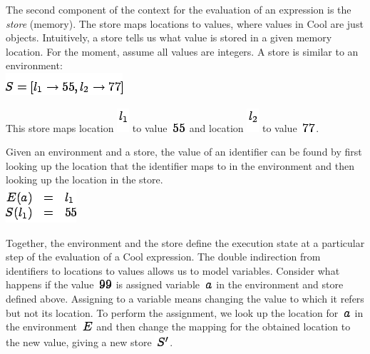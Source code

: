 \documentclass[]{article}
\begin{document}
The second component of the context for the evaluation of an expression
is the \emph{store} (memory). The store maps locations to values, where
values in Cool are just objects. Intuitively, a store tells us what
value is stored in a given memory location. For the moment, assume all
values are integers. A store is similar to an environment: \\

\includegraphics{img120.png}

This store maps location \includegraphics{img118.png} to value
\includegraphics{img121.png} and location \includegraphics{img119.png}
to value \includegraphics{img122.png}.

Given an environment and a store, the value of an identifier can be
found by first looking up the location that the identifier maps to in
the environment and then looking up the location in the store. \\

\includegraphics{img123.png}

Together, the environment and the store define the execution state at a
particular step of the evaluation of a Cool expression. The double
indirection from identifiers to locations to values allows us to model
variables. Consider what happens if the value
\includegraphics{img124.png} is assigned variable
\includegraphics{img30.png} in the environment and store defined above.
Assigning to a variable means changing the value to which it refers but
not its location. To perform the assignment, we look up the location for
\includegraphics{img30.png} in the environment
\includegraphics{img125.png} and then change the mapping for the
obtained location to the new value, giving a new store
\includegraphics{img126.png}.
\end{document}
